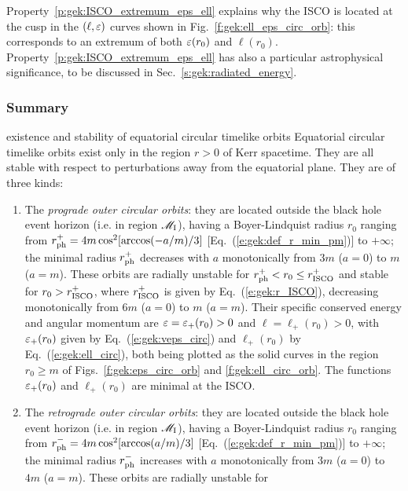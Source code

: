 Property~\ref{p:gek:ISCO_extremum_eps_ell} explains
why the ISCO is located at the cusp in the
$(\ell,\varepsilon)$ curves shown in Fig.~\ref{f:gek:ell_eps_circ_orb}:
this corresponds to an extremum of both $\varepsilon(r_0)$ and $\ell(r_0)$.
Property~\ref{p:gek:ISCO_extremum_eps_ell}
has also a particular astrophysical significance,
to be discussed in Sec.~\ref{s:gek:radiated_energy}.

\goodbreak

\subsubsection{Summary}

\begin{tprop}{existence and stability of equatorial circular timelike orbits}{}
Equatorial circular timelike orbits exist only in the region $r>0$ of Kerr spacetime.
They are all stable with respect to perturbations away from the equatorial plane.
They are of three kinds:
\begin{enumerate}
\item The \emph{prograde outer circular orbits}: they are located outside
the black hole event horizon (i.e. in region $\mathscr{M}_{\rm I}$), having a Boyer-Lindquist radius $r_0$ ranging
from  $r_{\rm ph}^+ = 4 m \cos^2[\arccos(-a/m)/3]$
[Eq.~(\ref{e:gek:def_r_min_pm})] to $+\infty$;
the minimal radius
$r_{\rm ph}^+$ decreases with $a$ monotonically from $3m$ ($a=0$) to $m$ ($a=m$).
These orbits are radially unstable for
$r_{\rm ph}^+ < r_0 \leq r_{\rm ISCO}^+$ and stable for $r_0 > r_{\rm ISCO}^+$,
where $r_{\rm ISCO}^+$ is given by Eq.~(\ref{e:gek:r_ISCO}),
decreasing monotonically from $6m$ ($a=0$) to $m$ ($a=m$).
Their specific conserved energy and angular momentum
are $\varepsilon = \varepsilon_+(r_0) >  0$ and $\ell = \ell_+(r_0) > 0$, with
$\varepsilon_+(r_0)$ given by Eq.~(\ref{e:gek:veps_circ}) and $\ell_+(r_0)$ by
Eq.~(\ref{e:gek:ell_circ}), both being plotted as the solid
curves in the region $r_0 \geq m$ of Figs.~\ref{f:gek:eps_circ_orb} and \ref{f:gek:ell_circ_orb}.
The functions $\varepsilon_+(r_0)$ and $\ell_+(r_0)$ are minimal at the ISCO.
\item The \emph{retrograde outer circular orbits}: they are located outside
the black hole event horizon (i.e. in region $\mathscr{M}_{\rm I}$), having a Boyer-Lindquist radius $r_0$ ranging
from $r_{\rm ph}^- = 4 m \cos^2[\arccos(a/m)/3]$
[Eq.~(\ref{e:gek:def_r_min_pm})] to $+\infty$; the minimal radius
$r_{\rm ph}^-$ increases with $a$ monotonically from $3m$ ($a=0$) to $4m$ ($a=m$).
These orbits are radially unstable for

\end{enumerate}
\end{tprop}
